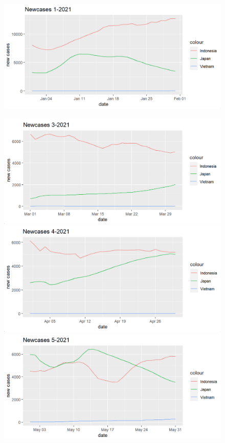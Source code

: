 \documentclass[a4paper]{article}
\theoremstyle{definition}
\begin{document}
\begin{enumerate}[1)]
\begin{figure}[H]
\begin{center}
    		\includegraphics[scale=0.5]{vi/nc_1_2021}
	    \end{center}
	\end{figure}

	
	\begin{figure}[H]
	    \begin{center}
    		\includegraphics[scale=0.5]{vi/nc_3_2021}
    		\includegraphics[scale=0.5]{vi/nc_4_2021}
    		\includegraphics[scale=0.5]{vi/nc_5_2021}

\end{center}
\end{figure}
\end{enumerate}
\end{document}
